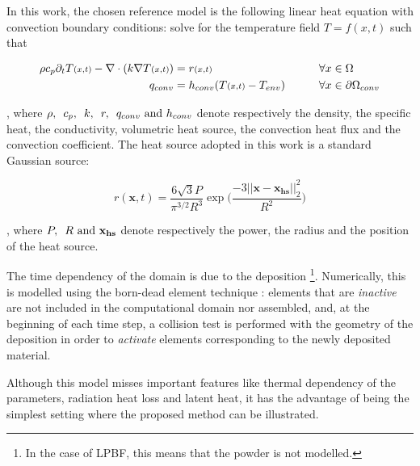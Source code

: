 In this work, the chosen reference model is
the following linear heat equation with convection
boundary conditions: solve for the temperature
field $T = f(x,t)$ such that

\begin{align}
  \rho c_p \partial_t T{\scriptstyle(x,t)} - \nabla \cdot (k \nabla T{\scriptstyle(x,t)}) &= r{\scriptstyle(x,t)}
  \qquad &\forall x &\in \Omega \label{eq:refheateq}\\
  q_{conv} &= h_{conv} ( T{\scriptstyle(x,t)} - T_{env} ) \qquad & \forall x &\in \partial \Omega {}_{conv}\notag
\end{align}

, where $\rho, \enskip c_p, \enskip k, \enskip  r, \enskip q_{conv} \textrm{ and } h_{conv}$
denote respectively
the density, the specific heat, the conductivity, volumetric
heat source, the convection heat flux and the convection coefficient.
The heat source adopted in this work is a standard Gaussian source:

\begin{equation}\label{eq:heatsource}
  r(\mathbf{x}, t) = \frac{6 \sqrt{3} P}{ \pi^{3/2} R^3}
  \exp\bigg( \frac{-3||\mathbf{x} - \mathbf{x_{hs}}||_2^2}{R^2}\bigg)
\end{equation}

, where $P, \enskip R \textrm{ and } \mathbf{x_{hs}}$
denote respectively the power, the radius and the position
of the heat source.\par

The time dependency of the domain is due to
the deposition
\footnote{ In the case of LPBF, this means that the powder is not modelled. }.
Numerically, this is modelled using  the born-dead element
technique \cite{Chiumenti2010}:
elements that are \textit{inactive} are not included in the
computational domain nor assembled,
and, at the beginning of each time step, a collision test
is performed with the geometry of the deposition
in order to \textit{activate} elements corresponding to
the newly deposited material.\par

Although this model misses important features like
thermal dependency of the parameters, radiation heat loss and
latent heat\cite{VanElsen2007, Hodge2021},
it has the advantage of being the simplest setting
where the proposed method can be illustrated.\par
